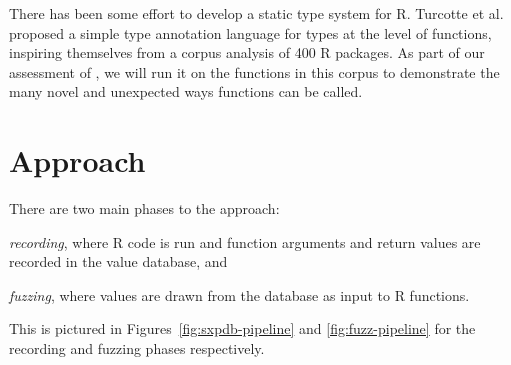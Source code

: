\documentclass[sigplan,nonacm,anonymous,review]{acmart}
\begin{document}
There has been some effort to develop a static type system for R.
Turcotte et al.~\cite{turcotte2020designing} proposed a simple type annotation language for types at the level of functions, inspiring themselves from a corpus analysis of 400 R packages.
As part of our assessment of \tool, we will run it on the functions in this corpus to demonstrate the many novel and unexpected ways functions can be called.




\section{Approach}
\label{sec:fuzzy}

There are two main phases to the approach:
%
\begin{inparaenum}[(1)]
\item \emph{recording}, where R code is run and function arguments and return values are recorded in the value database, and %
\item \emph{fuzzing}, where values are drawn from the database as input to R functions. 
\end{inparaenum}
%
This is pictured in Figures~\ref{fig:sxpdb-pipeline} and \ref{fig:fuzz-pipeline} for the recording and fuzzing phases respectively.
\end{document}
